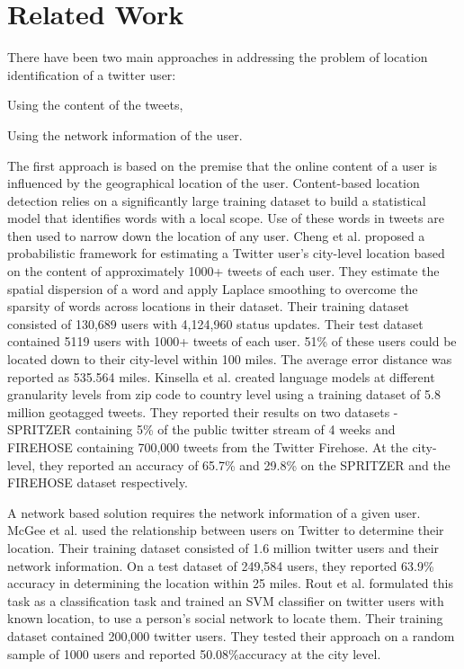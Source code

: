 \section{Related Work}
\label{sec:RelatedWork}
There have been two main approaches in addressing the problem of location identification of a twitter user: \begin{inparaenum}[(1)] 
\item Using the content of the tweets,
\item Using the network information of the user. 
\end{inparaenum}

The first approach is based on the premise that the online content of a user is influenced by the geographical location of the user. Content-based location detection relies on a significantly large training dataset to build a statistical model that identifies words with a local scope. Use of these words in tweets are then used to narrow down the location of any user. 
Cheng et al. \cite{cheng2010you} proposed a probabilistic framework for estimating a Twitter user's city-level location based on the content of approximately 1000+ tweets of each user. They estimate the spatial dispersion of a word and apply Laplace smoothing to overcome the sparsity of words across locations in their dataset. Their training dataset consisted of 130,689 users with 4,124,960 status updates. Their test dataset contained 5119 users with 1000+ tweets of each user. 51\%  of these users could be located down to their city-level within 100 miles. The average error distance was reported as 535.564 miles. Kinsella et al. \cite{ferrara2012web} created language models at different granularity levels from zip code to country level using a training dataset of 5.8 million geotagged tweets. They reported their results on two datasets - SPRITZER containing 5\% of the public twitter stream of 4 weeks and FIREHOSE containing 700,000 tweets from the Twitter Firehose. At the city-level, they reported an accuracy of 65.7\% and 29.8\% on the SPRITZER and the FIREHOSE dataset respectively.

A network based solution requires the network information of a given user. McGee et al. \cite{mcgee2013location} used the relationship between users on Twitter to determine their location. Their training dataset consisted of 1.6 million twitter users and their network information. On a test dataset of 249,584 users, they reported 63.9\% accuracy in determining the location within 25 miles. Rout et al. \cite{rout2013s} formulated this task as a classification task and trained an SVM classifier on twitter users with known location, to use a person's social network to locate them. Their training dataset contained 200,000 twitter users. They tested their approach on a random sample of 1000 users and reported 50.08\%accuracy at the city level.
